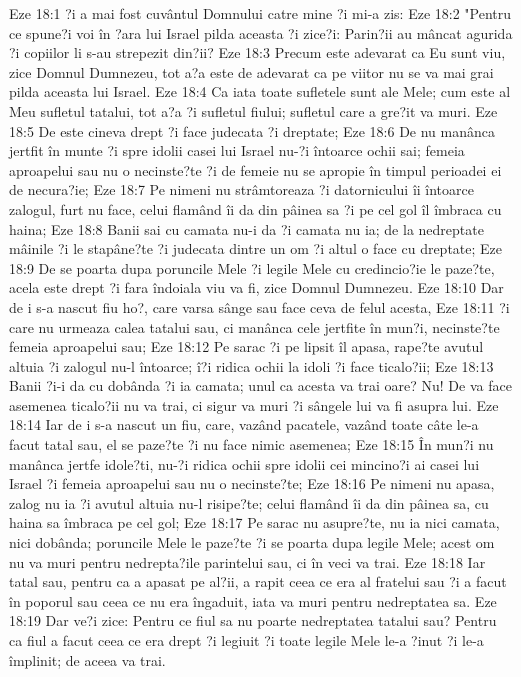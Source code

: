 Eze 18:1  ?i a mai fost cuvântul Domnului catre mine ?i mi-a zis:
Eze 18:2  "Pentru ce spune?i voi în ?ara lui Israel pilda aceasta ?i zice?i: Parin?ii au mâncat agurida ?i copiilor li s-au strepezit din?ii?
Eze 18:3  Precum este adevarat ca Eu sunt viu, zice Domnul Dumnezeu, tot a?a este de adevarat ca pe viitor nu se va mai grai pilda aceasta lui Israel.
Eze 18:4  Ca iata toate sufletele sunt ale Mele; cum este al Meu sufletul tatalui, tot a?a ?i sufletul fiului; sufletul care a gre?it va muri.
Eze 18:5  De este cineva drept ?i face judecata ?i dreptate;
Eze 18:6  De nu manânca jertfit în munte ?i spre idolii casei lui Israel nu-?i întoarce ochii sai; femeia aproapelui sau nu o necinste?te ?i de femeie nu se apropie în timpul perioadei ei de necura?ie;
Eze 18:7  Pe nimeni nu strâmtoreaza ?i datornicului îi întoarce zalogul, furt nu face, celui flamând îi da din pâinea sa ?i pe cel gol îl îmbraca cu haina;
Eze 18:8  Banii sai cu camata nu-i da ?i camata nu ia; de la nedreptate mâinile ?i le stapâne?te ?i judecata dintre un om ?i altul o face cu dreptate;
Eze 18:9  De se poarta dupa poruncile Mele ?i legile Mele cu credincio?ie le paze?te, acela este drept ?i fara îndoiala viu va fi, zice Domnul Dumnezeu.
Eze 18:10  Dar de i s-a nascut fiu ho?, care varsa sânge sau face ceva de felul acesta,
Eze 18:11  ?i care nu urmeaza calea tatalui sau, ci manânca cele jertfite în mun?i, necinste?te femeia aproapelui sau;
Eze 18:12  Pe sarac ?i pe lipsit îl apasa, rape?te avutul altuia ?i zalogul nu-l întoarce; î?i ridica ochii la idoli ?i face ticalo?ii;
Eze 18:13  Banii ?i-i da cu dobânda ?i ia camata; unul ca acesta va trai oare? Nu! De va face asemenea ticalo?ii nu va trai, ci sigur va muri ?i sângele lui va fi asupra lui.
Eze 18:14  Iar de i s-a nascut un fiu, care, vazând pacatele, vazând toate câte le-a facut tatal sau, el se paze?te ?i nu face nimic asemenea;
Eze 18:15  În mun?i nu manânca jertfe idole?ti, nu-?i ridica ochii spre idolii cei mincino?i ai casei lui Israel ?i femeia aproapelui sau nu o necinste?te;
Eze 18:16  Pe nimeni nu apasa, zalog nu ia ?i avutul altuia nu-l risipe?te; celui flamând îi da din pâinea sa, cu haina sa îmbraca pe cel gol;
Eze 18:17  Pe sarac nu asupre?te, nu ia nici camata, nici dobânda; poruncile Mele le paze?te ?i se poarta dupa legile Mele; acest om nu va muri pentru nedrepta?ile parintelui sau, ci în veci va trai.
Eze 18:18  Iar tatal sau, pentru ca a apasat pe al?ii, a rapit ceea ce era al fratelui sau ?i a facut în poporul sau ceea ce nu era îngaduit, iata va muri pentru nedreptatea sa.
Eze 18:19  Dar ve?i zice: Pentru ce fiul sa nu poarte nedreptatea tatalui sau? Pentru ca fiul a facut ceea ce era drept ?i legiuit ?i toate legile Mele le-a ?inut ?i le-a împlinit; de aceea va trai.
